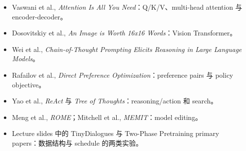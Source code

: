 \begin{itemize}
  \item Vaswani et al., \emph{Attention Is All You Need}：Q/K/V、multi-head attention 与 encoder-decoder。
  \item Dosovitskiy et al., \emph{An Image is Worth 16x16 Words}：Vision Transformer。
  \item Wei et al., \emph{Chain-of-Thought Prompting Elicits Reasoning in Large Language Models}。
  \item Rafailov et al., \emph{Direct Preference Optimization}：preference pairs 与 policy objective。
  \item Yao et al., \emph{ReAct} 与 \emph{Tree of Thoughts}：reasoning/action 和 search。
  \item Meng et al., \emph{ROME}；Mitchell et al., \emph{MEMIT}：model editing。
  \item Lecture slides 中的 TinyDialogues 与 Two-Phase Pretraining primary papers：数据结构与 schedule 的两类实验。
\end{itemize}


